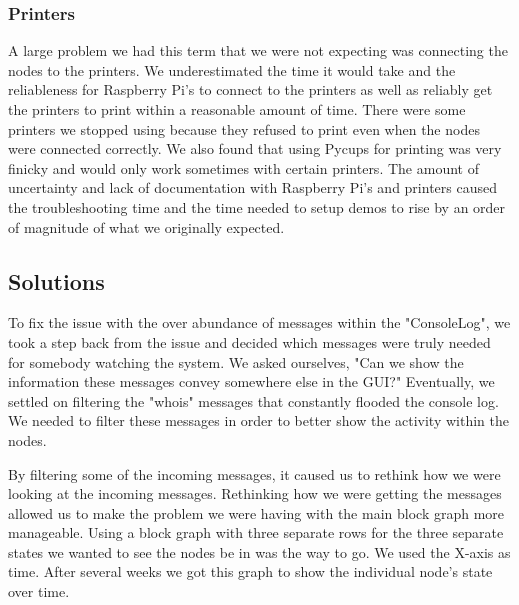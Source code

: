 \documentclass[draftclsnofoot, onecolumn, compsoc, 10pt]{IEEEtran}
\begin{document}
\subsubsection{Printers}
A large problem we had this term that we were not expecting was connecting the nodes to the printers. We underestimated the time it would take and the reliableness for Raspberry Pi's to connect to the printers as well as reliably get the printers to print within a reasonable amount of time. There were some printers we stopped using because they refused to print even when the nodes were connected correctly. We also found that using Pycups for printing was very finicky and would only work sometimes with certain printers. The amount of uncertainty and lack of documentation with Raspberry Pi's and printers caused the troubleshooting time and the time needed to setup demos to rise by an order of magnitude of what we originally expected.  


\subsection{Solutions}

To fix the issue with the over abundance of messages within the "ConsoleLog", we took a step back from the issue and decided which messages were truly needed for somebody watching the system. We asked ourselves, "Can we show the information these messages convey somewhere else in the GUI?" Eventually, we settled on filtering the "whois" messages that constantly flooded the console log. We needed to filter these messages 
in order to better show the activity within the nodes. 

By filtering some of the incoming messages, it caused us to rethink how we were looking at the incoming messages. Rethinking how we were getting the messages allowed us to make the problem we were having with the main block graph more manageable. Using a block graph with three separate rows for the three separate states we wanted to see the nodes be in was the way to go. We used the X-axis as time. After several weeks we got this graph to show the individual node's state over time.
\end{document}
